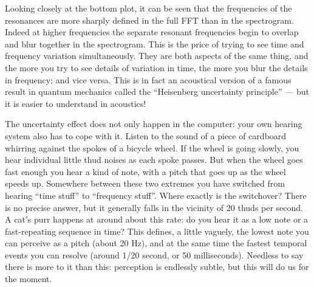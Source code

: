 

  Looking closely at the bottom plot, it can be seen that the frequencies of 
  the resonances are more sharply defined in the full FFT than in the 
  spectrogram. Indeed at higher frequencies the separate resonant frequencies 
  begin to overlap and blur together in the spectrogram. This is the price of 
  trying to see time and frequency variation simultaneously. They are both 
  aspects of the same thing, and the more you try to see details of variation 
  in time, the more you blur the details in frequency; and vice versa. This is 
  in fact an acoustical version of a famous result in quantum mechanics called 
  the ``Heisenberg uncertainty principle'' --- but it is easier to understand 
  in acoustics! 

  The uncertainty effect does not only happen in the computer: your own hearing 
  system also has to cope with it. Listen to the sound of a piece of cardboard 
  whirring against the spokes of a bicycle wheel. If the wheel is going slowly, 
  you hear individual little thud noises as each spoke passes. But when the 
  wheel goes fast enough you hear a kind of note, with a pitch that goes up as 
  the wheel speeds up. Somewhere between these two extremes you have switched 
  from hearing ``time stuff'' to ``frequency stuff''. Where exactly is the 
  switchover? There is no precise answer, but it generally falls in the 
  vicinity of 20 thuds per second. A cat's purr happens at around about this 
  rate: do you hear it as a low note or a fast-repeating sequence in time? This 
  defines, a little vaguely, the lowest note you can perceive as a pitch (about 
  20 Hz), and at the same time the fastest temporal events you can resolve 
  (around 1/20 second, or 50 milliseconds). Needless to say there is more to it 
  than this: perception is endlessly subtle, but this will do us for the 
  moment. 

